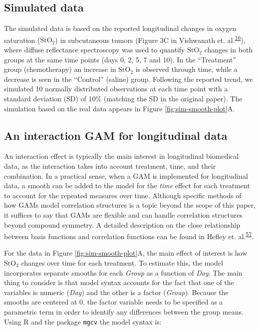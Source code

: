 \documentclass[
]{article}
\newcommand{\passthrough}[1]{#1}
\begin{document}
\hypertarget{simulated-data}{%
\subsection{Simulated data}\label{simulated-data}}

The simulated data is based on the reported longitudinal changes in oxygen saturation (\(\mbox{StO}_2\)) in subcutaneous tumors (Figure 3C in Vishwanath et. al.\textsuperscript{\protect\hyperlink{ref-vishwanath2009}{16}}), where diffuse reflectance spectroscopy was used to quantify \(\mbox{StO}_2\) changes in both groups at the same time points (days 0, 2, 5, 7 and 10). In the ``Treatment'' group (chemotherapy) an increase in \(\mbox{StO}_2\) is observed through time, while a decrease is seen in the ``Control'' (saline) group. Following the reported trend, we simulated 10 normally distributed observations at each time point with a standard deviation (SD) of 10\% (matching the SD in the original paper).
The simulation based on the real data appears in Figure \ref{fig:sim-smooth-plot}A.

\hypertarget{an-interaction-gam-for-longitudinal-data}{%
\subsection{An interaction GAM for longitudinal data}\label{an-interaction-gam-for-longitudinal-data}}

An interaction effect is typically the main interest in longitudinal biomedical data, as the interaction takes into account treatment, time, and their combination. In a practical sense, when a GAM is implemented for longitudinal data, a smooth can be added to the model for the \emph{time} effect for each treatment to account for the repeated measures over time. Although specific methods of how GAMs model correlation structures is a topic beyond the scope of this paper, it suffices to say that GAMs are flexible and can handle correlation structures beyond compound symmetry. A detailed description on the close relationship between basis functions and correlation functions can be found in Hefley et. al.\textsuperscript{\protect\hyperlink{ref-hefley2017}{57}}.

For the data in Figure \ref{fig:sim-smooth-plot}A, the main effect of interest is how \(\mbox{StO}_2\) changes over time for each treatment. To estimate this, the model incorporates separate smooths for each \emph{Group} as a function of \emph{Day}. The main thing to consider is that model syntax accounts for the fact that one of the variables is numeric (\emph{Day}) and the other is a factor (\emph{Group}). Because the smooths are centered at 0, the factor variable needs to be specified as a parametric term in order to identify any differences between the group means. Using R and the package \passthrough{\lstinline!mgcv!} the model syntax is:
\end{document}
